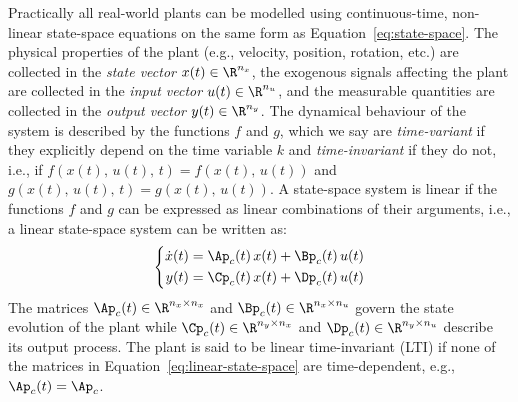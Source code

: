 Practically all real-world plants can be modelled using continuous-time, non-linear state-space equations on the same form as Equation~\eqref{eq:state-space}.
The physical properties of the plant (e.g., velocity, position, rotation, etc.) are collected in the \emph{state vector} $x(t) \in \R^{n_x}$, the exogenous signals affecting the plant are collected in the \emph{input vector} $u(t) \in \R^{n_u}$, and the measurable quantities are collected in the \emph{output vector} $y(t) \in \R^{n_y}$.
The dynamical behaviour of the system is described by the functions $f$ and $g$, which we say are \emph{time-variant} if they explicitly depend on the time variable $k$ and \emph{time-invariant} if they do not, i.e., if $f(x(t),\, u(t),\, t) = f(x(t),\, u(t))$ and $g(x(t),\, u(t),\, t) = g(x(t),\, u(t))$.
A state-space system is linear if the functions $f$ and $g$ can be expressed as linear combinations of their arguments, i.e., a linear state-space system can be written as:
%
\begin{equation}%
    \label{eq:linear-state-space}%
    \left\{\begin{aligned}
        \dot{x}(t) &= \Ap_c(t)\,x(t) + \Bp_c(t)\,u(t) \\
        y(t) &= \Cp_c(t)\,x(t) + \Dp_c(t)\,u(t) \\
    \end{aligned}\right.
\end{equation}
%
The matrices $\Ap_c(t) \in \R^{n_x \times n_x}$ and $\Bp_c(t) \in \R^{n_x \times n_u}$ govern the state evolution of the plant while $\Cp_c(t) \in \R^{n_y \times n_x}$ and $\Dp_c(t) \in \R^{n_y \times n_u}$ describe its output process.
The plant is said to be linear time-invariant (LTI) if none of the matrices in Equation~\eqref{eq:linear-state-space} are time-dependent, e.g., $\Ap_c(t) = \Ap_c$.

